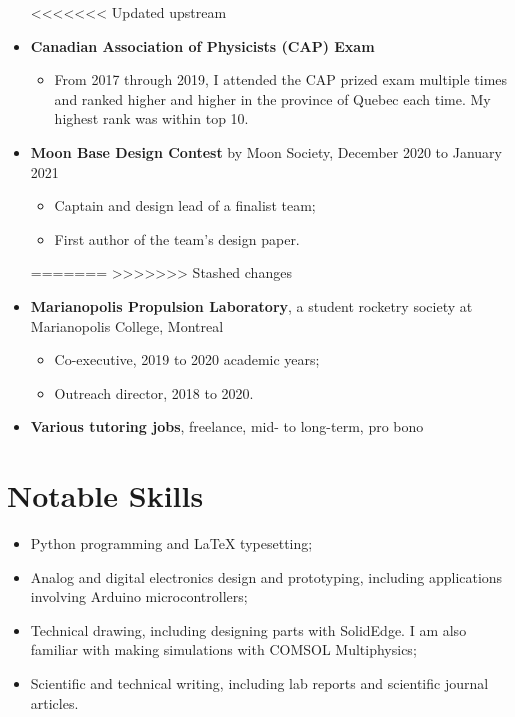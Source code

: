 \documentclass{article}
\newcommand{\cvsection}[1]{\section*{\rmfamily#1}}
\begin{document}
\begin{itemize}
<<<<<<< Updated upstream
    \item \textbf{Canadian Association of Physicists (CAP) Exam}
    \begin{itemize}
        \item From 2017 through 2019, I attended the CAP prized exam multiple times and ranked higher and higher in the province of Quebec each time. My highest rank was within top 10. 
    \end{itemize}

    \item \textbf{Moon Base Design Contest} by Moon Society, December 2020 to January 2021
    \begin{itemize}
        \item Captain and design lead of a finalist team;
        \item First author of the team's design paper.
    \end{itemize}
=======
>>>>>>> Stashed changes

    \item \textbf{Marianopolis Propulsion Laboratory}, a student rocketry society at Marianopolis College, Montreal
    \begin{itemize}
        \item Co-executive, 2019 to 2020 academic years;
        \item Outreach director, 2018 to 2020.
    \end{itemize}

    \item \textbf{Various tutoring jobs}, freelance, mid- to long-term, pro bono

\end{itemize}

\cvsection{Notable Skills}

\begin{itemize}
    \item Python programming and LaTeX typesetting;
    
    \item Analog and digital electronics design and prototyping, including applications involving Arduino microcontrollers;
    
    \item Technical drawing, including designing parts with SolidEdge. I am also familiar with making simulations with COMSOL Multiphysics;
    
    \item Scientific and technical writing, including lab reports and scientific journal articles.
    
    
\end{itemize}
\end{document}
